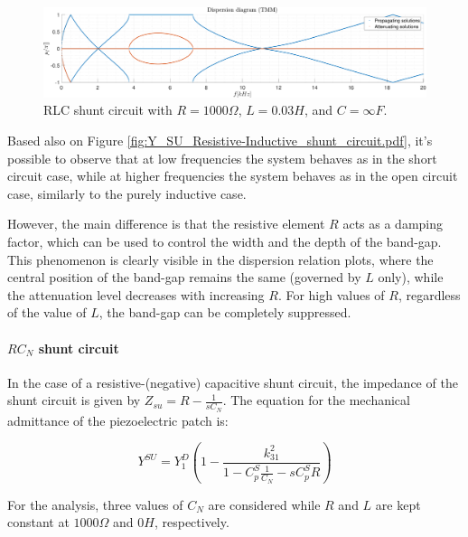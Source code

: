 \begin{figure}[H]
    \centering
    \includegraphics[width=\textwidth]{./img/MATLAB/TMM_ON-ON-ON_RLC_R1000_L0.03_CInf.pdf}
    \caption{RLC shunt circuit with $R = 1000 \Omega$, $L = 0.03 H$, and $C = \infty F$.}
    \label{fig:TMM_ON-ON-ON_RLC_R1000_L0.03_CInf.pdf}
\end{figure}

Based also on Figure \ref{fig:Y_SU_Resistive-Inductive_shunt_circuit.pdf}, it's possible to observe that at low frequencies the system behaves as in the short circuit case, while at higher frequencies the system behaves as in the open circuit case, similarly to the purely inductive case.

However, the main difference is that the resistive element $R$ acts as a damping factor, which can be used to control the width and the depth of the band-gap.
This phenomenon is clearly visible in the dispersion relation plots, where the central position of the band-gap remains the same (governed by $L$ only), while the attenuation level decreases with increasing $R$.
For high values of $R$, regardless of the value of $L$, the band-gap can be completely suppressed.



\paragraph{$RC_N$ shunt circuit}

In the case of a resistive-(negative) capacitive shunt circuit, the impedance of the shunt circuit is given by $Z_{su} = R - \frac{1}{sC_N}$.
The equation for the mechanical admittance of the piezoelectric patch is:

\begin{equation}
    Y^{SU} = Y_1^D \left( 1 - \frac{k_{31}^2}{1 - C_p^S \frac{1}{C_N} - s C_p^S R} \right)
    \label{eq:mechanical_admittance_RC_shunt}
\end{equation}

For the analysis, three values of $C_N$ are considered while $R$ and $L$ are kept constant at $1000 \Omega$ and $0H$, respectively.

